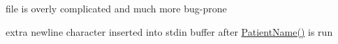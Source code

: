 
\begin{DoxyRefList}
\item[\label{bug__bug000001}%
\hypertarget{bug__bug000001}{}%
File \hyperlink{fileio_8hpp}{fileio.hpp} ]file is overly complicated and much more bug-\/prone  
\item[\label{bug__bug000002}%
\hypertarget{bug__bug000002}{}%
File \hyperlink{main_8cpp}{main.cpp} ]extra newline character inserted into stdin buffer after \hyperlink{namespaceavda_ae20728e7e8ae50bf2f74849e538841ea}{Patient\+Name()} is run 
\end{DoxyRefList}